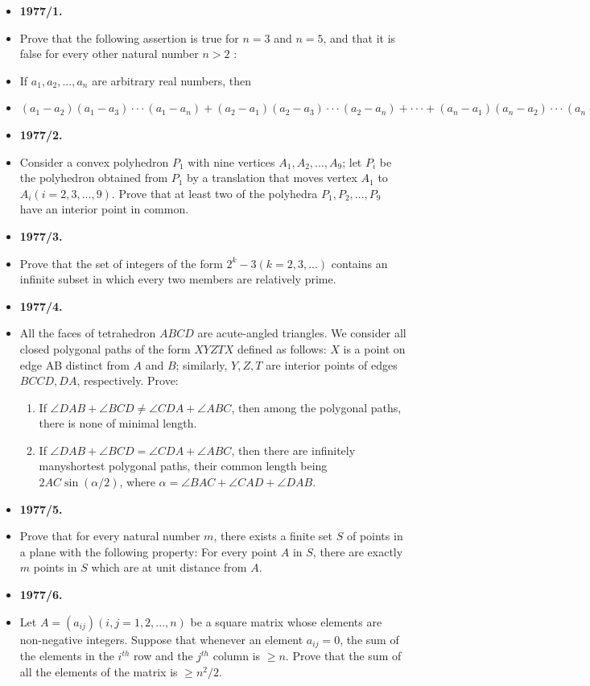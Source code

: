 \documentclass[a4paper,12pt]{article}
\begin{document}
\begin{itemize}[label={},leftmargin=0pt]
\item \textbf{\large 1977/1.}
\item Prove that the following assertion is true for $n = 3$ and $n = 5$, and that it is false for every other natural number $n > 2$ :
\item If $ a_1, a_2, ..., a_n$ are arbitrary real numbers, then 
\item $(a_1 - a_2)(a_1 - a_3)\cdot \cdot \cdot (a_1 - a_n) + (a_2 - a_1)(a_2 - a_3)\cdot \cdot \cdot  (a_2 - a_n) + \cdot \cdot \cdot + (a_n - a_1)(a_n - a_2)\cdot \cdot \cdot (a_n - a_{n-1}) \geq 0$
\item \textbf{\large 1977/2.}
\item Consider a convex polyhedron $P_1$ with nine vertices $A_1,A_2, ..., A_9$; let $P_i$ be the polyhedron obtained from $P_1$ by a translation that moves vertex $A_1$ to$A_i(i = 2, 3, ..., 9)$. Prove that at least two of the polyhedra $P_1, P_2, ..., P_9$ have an interior point in common.
\item \textbf{\large 1977/3.}
\item Prove that the set of integers of the form $2^k - 3(k = 2, 3, ...)$ contains an infinite subset in which every two members are relatively prime.
\item \textbf{\large 1977/4.}
\item All the faces of tetrahedron $ABCD$ are acute-angled triangles. We consider all closed polygonal paths of the form $XY ZT X$ defined as follows: $X$ is a point on edge AB distinct from $A$ and $B$; similarly, $Y, Z, T$ are interior points of edges $BCCD, DA$, respectively. Prove:
\begin{enumerate}[label=(\alph*)]
	\item If $\angle DAB + \angle BCD \neq \angle CDA + \angle ABC$, then among the polygonal paths, there is none of minimal length.
	\item If $\angle DAB + \angle BCD = \angle CDA + \angle ABC$, then there are infinitely manyshortest polygonal paths, their common length being $2AC \sin (\alpha /2)$, where $ \alpha = \angle BAC + \angle CAD +  \angle DAB$.
\end{enumerate}
\item \textbf{\large 1977/5.}
\item Prove that for every natural number $m$, there exists a finite set $S$ of points in a plane with the following property: For every point $A$ in $S$, there are exactly $m$ points in $S$ which are at unit distance from $A$.
\item \textbf{\large 1977/6.}
\item Let $A = (a_{ij} )(i, j = 1, 2, ..., n)$ be a square matrix whose elements are non-negative integers. Suppose that whenever an element $a_{ij} = 0$, the sum of the elements in the $i^{th}$ row and the $j^{th}$ column is $\geq n$. Prove that the sum of all the elements of the matrix is $\geq n^2/2$.
\end{itemize}
\end{document}
